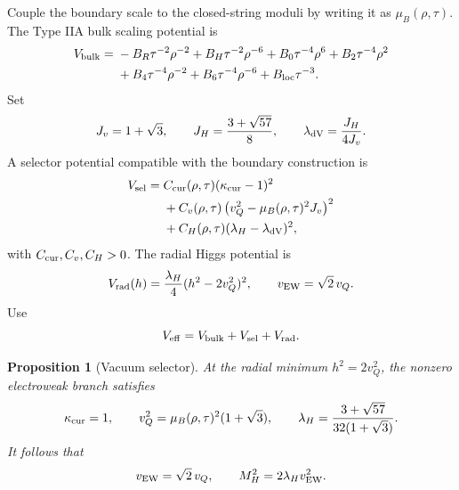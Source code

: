 \documentclass[11pt]{article}
\theoremstyle{plain}
\newtheorem{proposition}{Proposition}[section]
\theoremstyle{definition}
\begin{document}
Couple the boundary scale to the closed-string moduli by writing it as
\(\mu_B(\rho,\tau)\).  The Type IIA bulk scaling potential is
\begin{equation}
\begin{split}
  V_{\rm bulk}
  ={}&-B_R\tau^{-2}\rho^{-2}
  +B_H\tau^{-2}\rho^{-6}
  +B_0\tau^{-4}\rho^6
  +B_2\tau^{-4}\rho^2\\
  &+B_4\tau^{-4}\rho^{-2}
  +B_6\tau^{-4}\rho^{-6}
  +B_{\rm loc}\tau^{-3}.
  \label{new:eq:vbulk}
\end{split}
\end{equation}
Set
\begin{equation}
  J_v=1+\sqrt3,
  \qquad
  J_H=\frac{3+\sqrt{57}}{8},
  \qquad
  \lambda_{\rm dV}=\frac{J_H}{4J_v}.
  \label{new:eq:jv-jh}
\end{equation}
A selector potential compatible with the boundary construction is
\begin{equation}
\begin{split}
  V_{\rm sel}
  ={}&C_{\rm cur}(\rho,\tau)(\kappa_{\rm cur}-1)^2\\
  &+C_v(\rho,\tau)
  \left(v_Q^2-\mu_B(\rho,\tau)^2J_v\right)^2\\
  &+C_H(\rho,\tau)(\lambda_H-\lambda_{\rm dV})^2,
  \label{new:eq:vsel}
\end{split}
\end{equation}
with \(C_{\rm cur},C_v,C_H>0\).  The radial Higgs potential is
\begin{equation}
  V_{\rm rad}(h)=\frac{\lambda_H}{4}(h^2-2v_Q^2)^2,
  \qquad
  v_{\rm EW}=\sqrt2\,v_Q .
  \label{new:eq:vrad}
\end{equation}
Use
\begin{equation}
  V_{\rm eff}=V_{\rm bulk}+V_{\rm sel}+V_{\rm rad}.
  \label{new:eq:veff}
\end{equation}

\begin{proposition}[Vacuum selector]
\label{new:prop:vacuum-selector}
At the radial minimum \(h^2=2v_Q^2\), the nonzero electroweak branch satisfies
\begin{equation}
  \kappa_{\rm cur}=1,
  \qquad
  v_Q^2=\mu_B(\rho,\tau)^2(1+\sqrt3),
  \qquad
  \lambda_H=\frac{3+\sqrt{57}}{32(1+\sqrt3)}.
  \label{new:eq:selector-branch}
\end{equation}
It follows that
\begin{equation}
  v_{\rm EW}=\sqrt2\,v_Q,
  \qquad
  M_H^2=2\lambda_Hv_{\rm EW}^2.
  \label{new:eq:higgs-output}
\end{equation}
\end{proposition}
\end{document}
